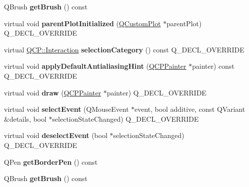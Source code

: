 \begin{DoxyCompactItemize}
\item 
Q\+Brush {\bfseries get\+Brush} () const \hypertarget{class_q_c_p_legend_a236fe4cd617c9f88620fd9de74417f20}{}\label{class_q_c_p_legend_a236fe4cd617c9f88620fd9de74417f20}

\item 
virtual void {\bfseries parent\+Plot\+Initialized} (\hyperlink{class_q_custom_plot}{Q\+Custom\+Plot} $\ast$parent\+Plot) Q\+\_\+\+D\+E\+C\+L\+\_\+\+O\+V\+E\+R\+R\+I\+DE\hypertarget{class_q_c_p_legend_a1caa526110fb4ad1185f05e3da7868f1}{}\label{class_q_c_p_legend_a1caa526110fb4ad1185f05e3da7868f1}

\item 
virtual \hyperlink{namespace_q_c_p_a2ad6bb6281c7c2d593d4277b44c2b037}{Q\+C\+P\+::\+Interaction} {\bfseries selection\+Category} () const Q\+\_\+\+D\+E\+C\+L\+\_\+\+O\+V\+E\+R\+R\+I\+DE\hypertarget{class_q_c_p_legend_a7f99bba4e7e859aa4d7753e4a59f34d6}{}\label{class_q_c_p_legend_a7f99bba4e7e859aa4d7753e4a59f34d6}

\item 
virtual void {\bfseries apply\+Default\+Antialiasing\+Hint} (\hyperlink{class_q_c_p_painter}{Q\+C\+P\+Painter} $\ast$painter) const Q\+\_\+\+D\+E\+C\+L\+\_\+\+O\+V\+E\+R\+R\+I\+DE\hypertarget{class_q_c_p_legend_a4d86ae7bb18e806c71f9b565ac83cc5f}{}\label{class_q_c_p_legend_a4d86ae7bb18e806c71f9b565ac83cc5f}

\item 
virtual void {\bfseries draw} (\hyperlink{class_q_c_p_painter}{Q\+C\+P\+Painter} $\ast$painter) Q\+\_\+\+D\+E\+C\+L\+\_\+\+O\+V\+E\+R\+R\+I\+DE\hypertarget{class_q_c_p_legend_acb52527b4acbff7232f1c1329e9aef86}{}\label{class_q_c_p_legend_acb52527b4acbff7232f1c1329e9aef86}

\item 
virtual void {\bfseries select\+Event} (Q\+Mouse\+Event $\ast$event, bool additive, const Q\+Variant \&details, bool $\ast$selection\+State\+Changed) Q\+\_\+\+D\+E\+C\+L\+\_\+\+O\+V\+E\+R\+R\+I\+DE\hypertarget{class_q_c_p_legend_af69d7d31a34de5ddb0a7e31d27711d11}{}\label{class_q_c_p_legend_af69d7d31a34de5ddb0a7e31d27711d11}

\item 
virtual void {\bfseries deselect\+Event} (bool $\ast$selection\+State\+Changed) Q\+\_\+\+D\+E\+C\+L\+\_\+\+O\+V\+E\+R\+R\+I\+DE\hypertarget{class_q_c_p_legend_af60408f3fa131f950177249ed1eff2a4}{}\label{class_q_c_p_legend_af60408f3fa131f950177249ed1eff2a4}

\item 
Q\+Pen {\bfseries get\+Border\+Pen} () const \hypertarget{class_q_c_p_legend_a60172c9d2212584f38f5d0c1e50970c7}{}\label{class_q_c_p_legend_a60172c9d2212584f38f5d0c1e50970c7}

\item 
Q\+Brush {\bfseries get\+Brush} () const \hypertarget{class_q_c_p_legend_a236fe4cd617c9f88620fd9de74417f20}{}\label{class_q_c_p_legend_a236fe4cd617c9f88620fd9de74417f20}

\end{DoxyCompactItemize}
